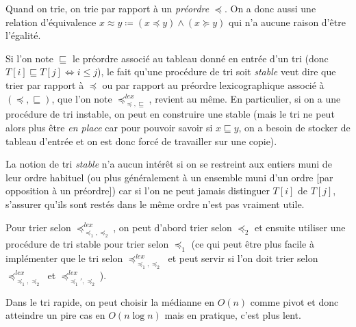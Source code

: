 \documentclass[../../agregation.tex]{subfiles}
\begin{document}
Quand on trie, on trie par rapport à un \emph{préordre} $\preccurlyeq$. On a donc aussi une relation d'équivalence $x\approx y\coloneqq (x\preccurlyeq y) \land (x\succcurlyeq y)$ qui n'a aucune raison d'être l'égalité.

Si l'on note $\sqsubseteq$ le préordre associé au tableau donné en entrée d'un tri (donc $T[i]\sqsubseteq T[j] \iff i \le j$), le fait qu'une procédure de tri soit \emph{stable} veut dire que trier par rapport à $\preccurlyeq$ ou par rapport au préordre lexicographique associé à $(\preccurlyeq, \sqsubseteq)$, que l'on note $\preccurlyeq^{lex}_{\preccurlyeq, \sqsubseteq}$, revient au même. En particulier, si on a une procédure de tri instable, on peut en construire une stable (mais le tri ne peut alors plus être \emph{en place} car pour pouvoir savoir si $x\sqsubseteq y$, on a besoin de stocker de tableau d'entrée et on est donc forcé de travailler sur une copie).

La notion de tri \emph{stable} n'a aucun intérêt si on se restreint aux entiers muni de leur ordre habituel (ou plus généralement à un ensemble muni d'un ordre [par opposition à un préordre]) car si l'on ne peut jamais distinguer $T[i]$ de $T[j]$, s'assurer qu'ils sont restés dans le même ordre n'est pas vraiment utile.

Pour trier selon $\preccurlyeq^{lex}_{\preccurlyeq_1, \preccurlyeq_2}$, on peut d'abord trier selon $\preccurlyeq_2$ et ensuite utiliser une procédure de tri stable pour trier selon $\preccurlyeq_1$ (ce qui peut être plus facile à implémenter que le tri selon $\preccurlyeq^{lex}_{\preccurlyeq_1, \preccurlyeq_2}$ et peut servir si l'on doit trier selon $\preccurlyeq^{lex}_{\preccurlyeq_1, \preccurlyeq_2}$ et $\preccurlyeq^{lex}_{\preccurlyeq_1', \preccurlyeq_2}$).

Dans le tri rapide, on peut choisir la médianne en $O(n)$ comme pivot et donc atteindre un pire cas en $O(n\log n)$ mais en pratique, c'est plus lent.
\end{document}
